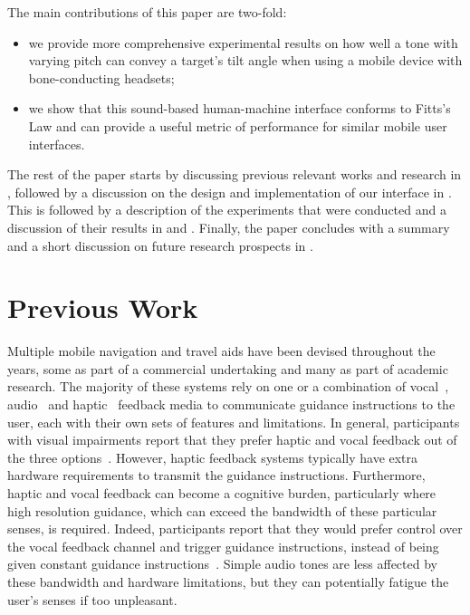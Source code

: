 \documentclass[]{interact}
\begin{document}
The main contributions of this paper are two-fold: 

\begin{itemize}
  \item we provide more comprehensive experimental results on how well a tone with varying pitch can convey a target's tilt angle when using a mobile device with bone-conducting headsets; 
  \item we show that this sound-based human-machine interface conforms to Fitts's Law and can provide a useful metric of performance for similar mobile user interfaces.
\end{itemize}

The rest of the paper starts by discussing previous relevant works and research in , followed by a discussion on the design and implementation of our interface in .
This is followed by a description of the experiments that were conducted and a discussion of their results in  and .
Finally, the paper concludes with a summary and a short discussion on future research prospects in .

\section{Previous Work}\label{sec:prev-work}

Multiple mobile navigation and travel aids have been devised throughout the years, some as part of a commercial undertaking and many as part of academic research.
The majority of these systems rely on one or a combination of vocal~\citep{mocanu2016when,chessa2016integrated,kanwal2015navigation}, audio~\citep{schwarze2015intuitive,rodriguez2012obstacle,katz2010navig} and haptic~\citep{rivera-rubio2015assistive,lee2015rgb,xiao2015assistive} feedback media to communicate guidance instructions to the user, each with their own sets of features and limitations.
In general, participants with visual impairments report that they prefer haptic and vocal feedback out of the three options~\citep{arditi2013user}.
However, haptic feedback systems typically have extra hardware requirements to transmit the guidance instructions.
Furthermore, haptic and vocal feedback can become a cognitive burden, particularly where high resolution guidance, which can exceed the bandwidth of these particular senses, is required.
Indeed, participants report that they would prefer control over the vocal feedback channel and trigger guidance instructions, instead of being given constant guidance instructions~\citep{arditi2013user}.
Simple audio tones are less affected by these bandwidth and hardware limitations, but they can potentially fatigue the user's senses if too unpleasant.
\end{document}
